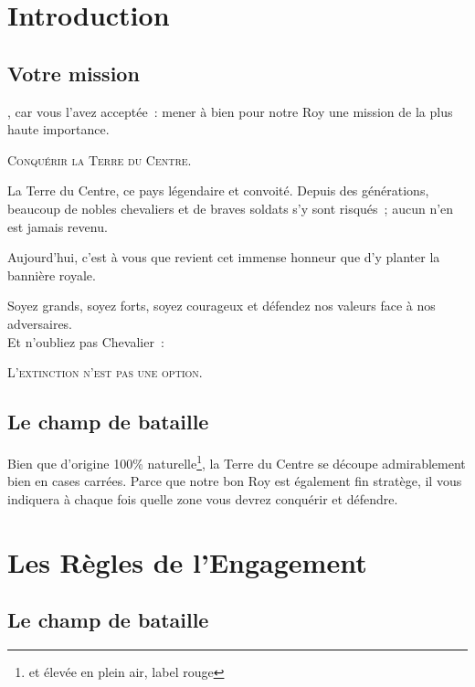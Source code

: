 \section{Introduction}

\newpage

\subsection{Votre mission}

, car vous l'avez acceptée~: mener à bien
pour notre Roy une mission de la plus haute importance.

\begin{center}
  {\large\textsc{Conquérir la Terre du Centre.}}
\end{center}

La Terre du Centre, ce pays légendaire et convoité. Depuis des
générations, beaucoup de nobles chevaliers et de braves soldats s'y sont
risqués~; aucun n'en est jamais revenu.

Aujourd'hui, c'est à vous que revient cet immense honneur que d'y
planter la bannière royale.

Soyez grands, soyez forts, soyez courageux et défendez nos valeurs
face à nos adversaires.\\

Et n'oubliez pas Chevalier~:

\begin{center}
  \textsc{L'extinction n'est pas une option.}
\end{center}

\subsection{Le champ de bataille}

Bien que d'origine 100\%{} naturelle\footnote{et élevée en plein air,
  label rouge}, la Terre du Centre se découpe admirablement bien en
cases carrées. Parce que notre bon Roy est également fin stratège, il
vous indiquera à chaque fois quelle zone vous devrez conquérir et
défendre.
\newpage

\section{Les Règles de l'Engagement}

\subsection{Le champ de bataille}

